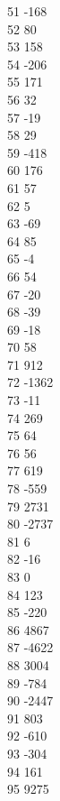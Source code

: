 { 51	-168 \\
 52	80 \\
 53	158 \\
 54	-206 \\
 55	171 \\
 56	32 \\
 57	-19 \\
 58	29 \\
 59	-418 \\
 60	176 \\
 61	57 \\
 62	5 \\
 63	-69 \\
 64	85 \\
 65	-4 \\
 66	54 \\
 67	-20 \\
 68	-39 \\
 69	-18 \\
 70	58 \\
 71	912 \\
 72	-1362 \\
 73	-11 \\
 74	269 \\
 75	64 \\
 76	56 \\
 77	619 \\
 78	-559 \\
 79	2731 \\
 80	-2737 \\
 81	6 \\
 82	-16 \\
 83	0 \\
 84	123 \\
 85	-220 \\
 86	4867 \\
 87	-4622 \\
 88	3004 \\
 89	-784 \\
 90	-2447 \\
 91	803 \\
 92	-610 \\
 93	-304 \\
 94	161 \\
 95	9275 \\
}
